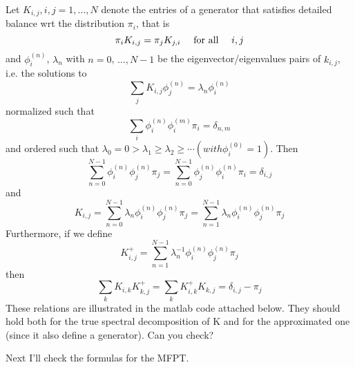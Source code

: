 \documentclass[a4paper]{article}
\begin{document}
Let $K_{i,j} , i,j=1,\ldots, N$ denote the entries of a generator that satisfies detailed balance wrt the distribution $\pi_i$, that is
\begin{equation}
\pi_i K_{i,j} = \pi_j K_{j,i} 		\text{ \quad   for all \quad    }  i,j
\end{equation}
and $\phi_i^{(n)}$, $\lambda_n$ with $n=0$, $\ldots, N-1$ be the eigenvector/eigenvalues pairs of $k_{i,j}$, i.e. the solutions to
\begin{equation}
\sum_j K_{i,j} \phi_j^{(n)} = \lambda_n \phi_i^{(n)}
\end{equation}
normalized such that
\begin{equation}
\sum_{i} \phi_i^{(n)} \phi_i^{(m)} \pi_i = \delta_{n,m}
\end{equation}
and ordered such that $\lambda_0 = 0 > \lambda_1 \ge \lambda_2 \ge \cdots (with \phi_i^{(0)} = 1)$. 
Then
\begin{equation}
\sum_{n=0}^{N-1} \phi_i^{(n)} \phi_j^{(n)} \pi_j = \sum_{n=0}^{N-1} \phi_j^{(n)} \phi_i^{(n)} \pi_i = \delta_{i,j} 
\end{equation}
and
\begin{equation}
K_{i,j} = \sum_{n=0}^{N-1} \lambda_n \phi_i^{(n)} \phi_j^{(n)} \pi_j = \sum_{n=1}^{N-1} \lambda_n \phi_i^{(n)} \phi_j^{(n)} \pi_j
\end{equation}
Furthermore, if we define
\begin{equation}
K^+_{i,j} = \sum_{n=1}^{N-1} \lambda_n^{-1} \phi_i^{(n)} \phi_j^{(n)} \pi_j
\end{equation}
then
\begin{equation}
\sum_k K_{i,k} K^+_{k,j} = \sum_k K^+_{i,k} K_{k,j} = \delta_{i,j} - \pi_j 
\end{equation}
These relations are illustrated in the matlab code attached below. They should hold both for the true spectral decomposition of K and for the approximated one (since it also define a generator). Can you check?

Next I’ll check the formulas for the MFPT.
\end{document}
